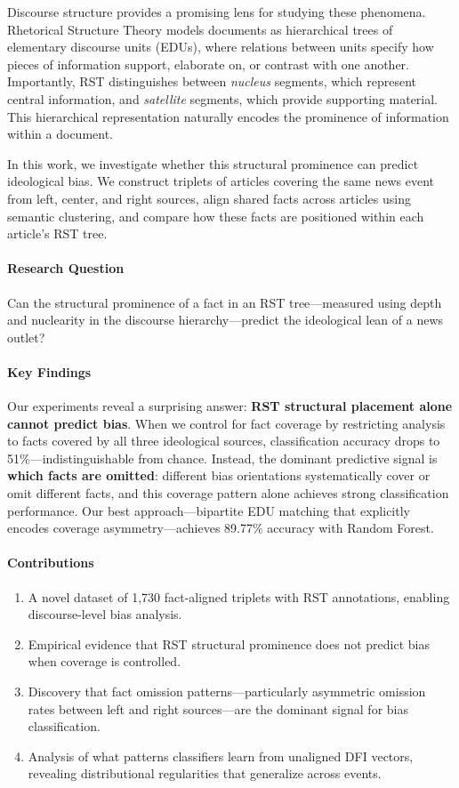 \documentclass[11pt]{article}
\begin{document}
Discourse structure provides a promising lens for studying these phenomena. Rhetorical Structure Theory \citep{nguyen2021rstparsingscratch} models documents as hierarchical trees of elementary discourse units (EDUs), where relations between units specify how pieces of information support, elaborate on, or contrast with one another. Importantly, RST distinguishes between \emph{nucleus} segments, which represent central information, and \emph{satellite} segments, which provide supporting material. This hierarchical representation naturally encodes the prominence of information within a document.

In this work, we investigate whether this structural prominence can predict ideological bias. We construct triplets of articles covering the same news event from left, center, and right sources, align shared facts across articles using semantic clustering, and compare how these facts are positioned within each article's RST tree.

\paragraph{Research Question} Can the structural prominence of a fact in an RST tree---measured using depth and nuclearity in the discourse hierarchy---predict the ideological lean of a news outlet?

\paragraph{Key Findings} Our experiments reveal a surprising answer: \textbf{RST structural placement alone cannot predict bias}. When we control for fact coverage by restricting analysis to facts covered by all three ideological sources, classification accuracy drops to 51\%---indistinguishable from chance. Instead, the dominant predictive signal is \textbf{which facts are omitted}: different bias orientations systematically cover or omit different facts, and this coverage pattern alone achieves strong classification performance. Our best approach---bipartite EDU matching that explicitly encodes coverage asymmetry---achieves 89.77\% accuracy with Random Forest.

\paragraph{Contributions}
\begin{enumerate}
    \item A novel dataset of 1,730 fact-aligned triplets with RST annotations, enabling discourse-level bias analysis.
    \item Empirical evidence that RST structural prominence does not predict bias when coverage is controlled.
    \item Discovery that fact omission patterns---particularly asymmetric omission rates between left and right sources---are the dominant signal for bias classification.
    \item Analysis of what patterns classifiers learn from unaligned DFI vectors, revealing distributional regularities that generalize across events.
\end{enumerate}
\end{document}
